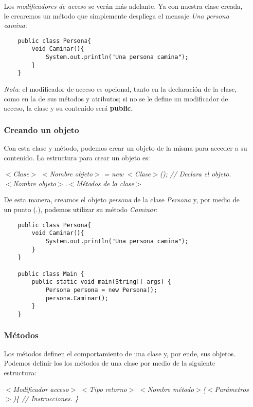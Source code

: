 Los \textit{modificadores de acceso} se verán más adelante. Ya con nuestra clase creada, le crearemos un método que simplemente despliega el mensaje \textit{Una persona camina}:
\begin{lstlisting}
    public class Persona{
        void Caminar(){
            System.out.println("Una persona camina");
        }
    }
\end{lstlisting}

\textit{Nota}: el modificador de acceso es opcional, tanto en la declaración de la clase, como en la de sus métodos y atributos; si no se le define un modificador de acceso, la clase y su contenido será \textbf{public}.


\subsubsection{Creando un objeto}
\hspace{0.55cm}Con esta clase y método, podemos crear un objeto de la misma para acceder a su contenido. La estructura para crear un objeto es:
\begin{center}
    \textit{
        $<$Clase$>$ $<$Nombre objeto$>$ = new $<$Clase$>$(); // Declara el objeto. \\
        $<$Nombre objeto$>$.$<$Métodos de la clase$>$
    }
\end{center}

De esta manera, creamos el objeto \textit{persona} de la clase \textit{Persona} y, por medio de un punto (.), podemos utilizar su método \textit{Caminar}:
\begin{lstlisting}
    public class Persona{
        void Caminar(){
            System.out.println("Una persona camina");
        }
    }
    
    public class Main {
        public static void main(String[] args) {
            Persona persona = new Persona();
            persona.Caminar();
        }
    }
\end{lstlisting}


\subsubsection{Métodos}
\hspace{0.55cm}Los métodos definen el comportamiento de una clase y, por ende, sus objetos. Podemos definir los los métodos de una clase por medio de la siguiente estructura:
\begin{center}
    \textit{$<$Modificador acceso$>$ $<$Tipo retorno$>$ $<$Nombre método$>$($<$Parámetros$>$)\{ // Instrucciones. \}}
\end{center}

